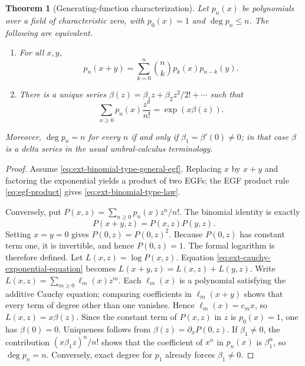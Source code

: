 \documentclass[11pt,a4paper,oneside,openany]{book}
\newtheorem{theorem}{Theorem}[chapter]
\theoremstyle{definition}
\theoremstyle{remark}
\begin{document}
\begin{theorem}[Generating-function characterization]
\label{thm:ext-binomial-type-characterization}
Let \(p_n(x)\) be polynomials over a field of characteristic zero, with
\(p_0(x)=1\) and \(\deg p_n\le n\).  The following are equivalent.
\begin{enumerate}
\item For all \(x,y\),
\begin{equation}\label{eq:ext-binomial-type-law}
 p_n(x+y)=\sum_{k=0}^n\binom nkp_k(x)p_{n-k}(y).
\end{equation}
\item There is a unique series
\(\beta(z)=\beta_1z+\beta_2z^2/2!+\cdots\) such that
\begin{equation}\label{eq:ext-binomial-type-general-egf}
 \sum_{n\ge0}p_n(x)\frac{z^n}{n!}=\exp(x\beta(z)).
\end{equation}
\end{enumerate}
Moreover, \(\deg p_n=n\) for every \(n\) if and only if
\(\beta_1=\beta'(0)\ne0\); in that case \(\beta\) is a delta series in the
usual umbral-calculus terminology.
\end{theorem}
\begin{proof}
Assume \eqref{eq:ext-binomial-type-general-egf}.  Replacing \(x\) by \(x+y\)
and factoring the exponential yields a product of two EGFs; the EGF product
rule \eqref{eq:egf-product} gives \eqref{eq:ext-binomial-type-law}.

Conversely, put
\(P(x,z)=\sum_{n\ge0}p_n(x)z^n/n!\).  The binomial identity is exactly
\begin{equation}\label{eq:ext-cauchy-exponential-equation}
 P(x+y,z)=P(x,z)P(y,z).
\end{equation}
Setting \(x=y=0\) gives \(P(0,z)=P(0,z)^2\).  Because \(P(0,z)\) has
constant term one, it is invertible, and hence \(P(0,z)=1\).  The formal
logarithm is therefore defined.  Let \(L(x,z)=\log P(x,z)\).  Equation
\eqref{eq:ext-cauchy-exponential-equation} becomes
\(L(x+y,z)=L(x,z)+L(y,z)\).  Write
\(L(x,z)=\sum_{m\ge0}\ell_m(x)z^m\).  Each \(\ell_m(x)\) is a polynomial
satisfying the additive Cauchy equation; comparing coefficients in
\(\ell_m(x+y)\) shows that every term of degree other than one vanishes.
Hence \(\ell_m(x)=c_mx\), so \(L(x,z)=x\beta(z)\).  Since the
constant term of \(P(x,z)\) in \(z\) is \(p_0(x)=1\), one has
\(\beta(0)=0\).  Uniqueness follows from
\(\beta(z)=\partial_xP(0,z)\).  If \(\beta_1\ne0\), the contribution
\((x\beta_1z)^n/n!\) shows that the coefficient of \(x^n\) in \(p_n(x)\) is
\(\beta_1^n\), so \(\deg p_n=n\).  Conversely, exact degree for \(p_1\)
already forces \(\beta_1\ne0\).
\end{proof}
\end{document}
